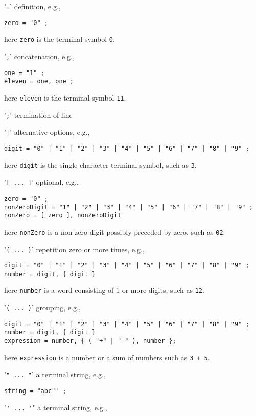 \begin{description}
\item '\verb|=|' definition, e.g., 
  \begin{lstlisting}[language=EBNF]
zero = "0" ;
  \end{lstlisting}
  here \verb|zero| is the terminal symbol \verb|0|.
\item '\verb|,|' concatenation, e.g.,
  \begin{lstlisting}[language=EBNF]
one = "1" ;
eleven = one, one ;
  \end{lstlisting}
  here \verb|eleven| is the terminal symbol \verb|11|.
\item '\verb|;|' termination of line
\item '\verb!|!' alternative options, e.g.,
  \begin{lstlisting}[language=EBNF]
digit = "0" | "1" | "2" | "3" | "4" | "5" | "6" | "7" | "8" | "9" ;
  \end{lstlisting}
  here \verb|digit| is the single character terminal symbol, such as \verb|3|.
\item '\verb|[ ... ]|' optional, e.g.,
  \begin{lstlisting}[language=EBNF]
zero = "0" ;
nonZeroDigit = "1" | "2" | "3" | "4" | "5" | "6" | "7" | "8" | "9" ;
nonZero = [ zero ], nonZeroDigit
  \end{lstlisting}
  here \verb|nonZero| is a non-zero digit possibly preceded by zero, such as \verb|02|.
\item '\verb|{ ... }|' repetition zero or more times, e.g., 
  \begin{lstlisting}[language=EBNF]
digit = "0" | "1" | "2" | "3" | "4" | "5" | "6" | "7" | "8" | "9" ;
number = digit, { digit }
  \end{lstlisting}
  here \verb|number| is a word consisting of 1 or more digits, such as \verb|12|.
\item '\verb|( ... )|' grouping, e.g.,
  \begin{lstlisting}[language=EBNF]
digit = "0" | "1" | "2" | "3" | "4" | "5" | "6" | "7" | "8" | "9" ;
number = digit, { digit }
expression = number, { ( "+" | "-" ), number };
  \end{lstlisting}
  here \verb|expression| is a number or a sum of numbers such as \verb|3 + 5|.
\item '\verb|" ... "|' a terminal string, e.g.,
  \begin{lstlisting}[language=EBNF]
string = "abc"' ;
  \end{lstlisting}
\item "\verb|' ... '|" a terminal string, e.g.,

\end{description}

